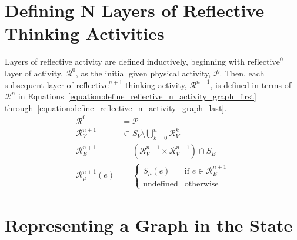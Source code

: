 \section{Defining N Layers of Reflective Thinking Activities}

Layers of reflective activity are defined inductively, beginning with
$\text{reflective}^0$ layer of activity, $\mathcal{R}^0$, as the
initial given physical activity, $\mathcal{P}$.  Then, each subsequent
layer of $\text{reflective}^{n+1}$ thinking activity,
$\mathcal{R}^{n+1}$, is defined in terms of $\mathcal{R}^n$ in
{\mbox{Equations~\ref{equation:define_reflective_n_activity_graph_first}}}
{\mbox{through~\ref{equation:define_reflective_n_activity_graph_last}}}.
\begin{align}
\label{equation:define_reflective_n_activity_graph_first}
                                        \mathcal{R}^0 &= \mathcal{P} \\
                                     \mathcal{R}^{n+1}_V &\subset S_V \setminus \bigcup_{k=0}^n\mathcal{R}^k_V \\
                                   \mathcal{R}^{n+1}_E &= (\mathcal{R}^{n+1}_V \times \mathcal{R}^{n+1}_V) \cap S_E \\
\label{equation:define_reflective_n_activity_graph_last}
                              \mathcal{R}^{n+1}_\mu(e) &= {\left\{
                                                            \begin{array}{ll}
                                                              S_\mu(e)          & \text{if }e {\in} \mathcal{R}^{n+1}_E \\
                                                              \text{undefined} & \text{otherwise}
                                                            \end{array}
                                                          \right.}
\end{align}

\section{Representing a Graph in the State}

